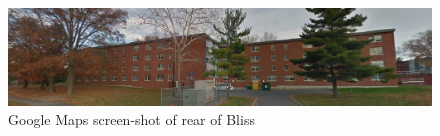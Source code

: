 \documentclass{article}
\begin{document}
                                                                                                                                                                                                                                                                                                                                                                                                                                                                                                                                                                                                                                                                                                         
		
		\begin{figure} [H]
				\begin{center}
					\includegraphics[scale=.3]{bliss.png}
						\captionsetup{labelformat=empty}
						\caption{Google Maps screen-shot of rear of Bliss}
				\end{center}
			\end{figure}
		
		
	\newpage
\end{document}
